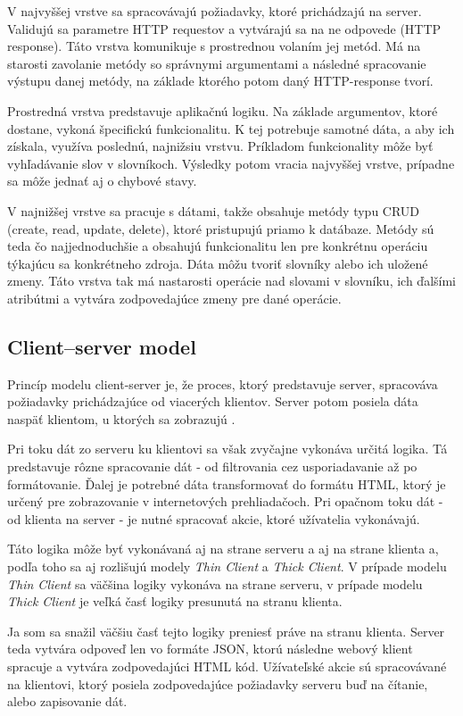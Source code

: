 \documentclass[
  digital, %
  table,   %
  lof,     %
  lot,     %
]{fithesis3}
\begin{document}
V najvyššej vrstve sa spracovávajú požiadavky, ktoré prichádzajú na server. Validujú sa parametre HTTP requestov a vytvárajú sa na ne odpovede (HTTP response). Táto vrstva komunikuje s prostrednou volaním jej metód. Má na starosti zavolanie metódy so správnymi argumentami a následné spracovanie výstupu danej metódy, na základe ktorého potom daný HTTP-response tvorí.

Prostredná vrstva predstavuje aplikačnú logiku. Na základe argumentov, ktoré dostane, vykoná špecifickú funkcionalitu. K tej potrebuje samotné dáta, a aby ich získala, využíva poslednú, najnižsiu vrstvu. Príkladom funkcionality môže byť vyhľadávanie slov v slovníkoch. Výsledky potom vracia najvyššej vrstve, prípadne sa môže jednať aj o chybové stavy.

V najnižšej vrstve sa pracuje s dátami, takže obsahuje metódy typu CRUD (create, read, update, delete), ktoré pristupujú priamo k datábaze. Metódy sú teda čo najjednoduchšie a obsahujú funkcionalitu len pre konkrétnu operáciu týkajúcu sa konkrétneho zdroja. Dáta môžu tvoriť slovníky alebo ich uložené zmeny. Táto vrstva tak má nastarosti operácie nad slovami v slovníku, ich ďalšími atribútmi a vytvára zodpovedajúce zmeny pre dané operácie.

\subsection{Client–server model}
Princíp modelu client-server je, že proces, ktorý predstavuje server, spracováva požiadavky prichádzajúce od viacerých klientov. Server potom posiela dáta naspäť klientom, u ktorých sa zobrazujú \parencite{hanson2000client}.

Pri toku dát zo serveru ku klientovi sa však zvyčajne vykonáva určitá logika. Tá predstavuje rôzne spracovanie dát - od filtrovania cez usporiadavanie až po formátovanie. Ďalej je potrebné dáta transformovať do formátu HTML, ktorý je určený pre zobrazovanie v internetových prehliadačoch. Pri opačnom toku dát - od klienta na server - je nutné spracovať akcie, ktoré užívatelia vykonávajú.

Táto logika môže byť vykonávaná aj na strane serveru a aj na strane klienta a, podľa toho sa aj rozlišujú modely \textit{Thin Client} a \textit{Thick Client}. V prípade modelu \textit{Thin Client} sa väčšina logiky vykonáva na strane serveru, v prípade modelu \textit{Thick Client} je veľká časť logiky presunutá na stranu klienta.

Ja som sa snažil väčšiu časť tejto logiky preniesť práve na stranu klienta. Server teda vytvára odpoveď len vo formáte JSON, ktorú následne webový klient spracuje a vytvára zodpovedajúci HTML kód. Užívateľské akcie sú spracovávané na klientovi, ktorý posiela zodpovedajúce požiadavky serveru buď na čítanie, alebo zapisovanie dát.
\end{document}
